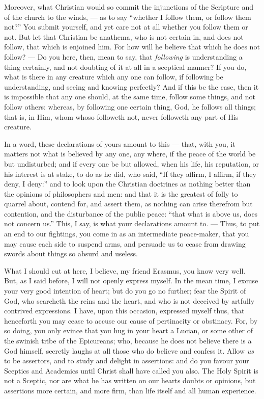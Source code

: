 Moreover, what Christian would so commit the injunctions of the Scripture and of the church to the winds, — as to say “whether I follow them, or follow them not?” You submit yourself, and yet care not at all whether you follow them or not. But let that Christian be anathema, who is not certain in, and does not follow, that which is enjoined him. For how will he believe that which he does not follow? — Do you here, then, mean to say, that \emph{following }is understanding a thing certainly, and not doubting of it at all in a sceptical manner? If you do, what is there in any creature which any one can follow, if following be understanding, and seeing and knowing perfectly? And if this be the case, then it is impossible that any one should, at the same time, follow some things, and not follow others: whereas, by following one certain thing, God, he follows all things; that is, in Him, whom whoso followeth not, never followeth any part of His creature.

In a word, these declarations of yours amount to this — that, with you, it matters not what is believed by any one, any where, if the peace of the world be but undisturbed; and if every one be but allowed, when his life, his reputation, or his interest is at stake, to do as he did, who said, “If they affirm, I affirm, if they deny, I deny:” and to look upon the Christian doctrines as nothing better than the opinions of philosophers and men: and that it is the greatest of folly to quarrel about, contend for, and assert them, as nothing can arise therefrom but contention, and the disturbance of the public peace: “that what is above us, does not concern us.” This, I say, is what your declarations amount to. — Thus, to put an end to our fightings, you come in as an intermediate peace-maker, that you may cause each side to suspend arms, and persuade us to cease from drawing swords about things so absurd and useless.

What I should cut at here, I believe, my friend Erasmus, you know very well. But, as I said before, I will not openly express myself. In the mean time, I excuse your very good intention of heart; but do you go no further; fear the Spirit of God, who searcheth the reins and the heart, and who is not deceived by artfully contrived expressions. I have, upon this occasion, expressed myself thus, that henceforth you may cease to accuse our cause of pertinacity or obstinacy. For, by so doing, you only evince that you hug in your heart a Lucian, or some other of the swinish tribe of the Epicureans; who, because he does not believe there is a God himself, secretly laughs at all those who do believe and confess it. Allow \emph{us }to be assertors, and to study and delight in assertions: and do you favour your Sceptics and Academics until Christ shall have called you also. The Holy Spirit is not a Sceptic, nor are what he has written on our hearts doubts or opinions, but assertions more certain, and more firm, than life itself and all human experience.

